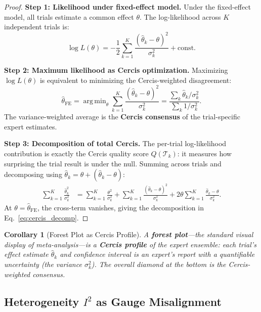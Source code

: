 \documentclass[12pt,a4paper]{article}
\newtheorem{corollary}[theorem]{Corollary}
\theoremstyle{remark}
\newcommand{\Cercis}{\textsf{Cercis}}
\DeclareMathOperator{\argmin}{arg\,min}
\begin{document}
\begin{proof}
\noindent\textbf{Step 1: Likelihood under fixed-effect model.}
Under the fixed-effect model, all trials estimate a common effect $\theta$.
The log-likelihood across $K$ independent trials is:
\begin{equation}
  \log L(\theta) = -\frac{1}{2} \sum_{k=1}^K \frac{(\hat{\theta}_k - \theta)^2}
  {\sigma_k^2} + \text{const}.
\end{equation}

\smallskip
\noindent\textbf{Step 2: Maximum likelihood as Cercis optimization.}
Maximizing $\log L(\theta)$ is equivalent to minimizing the
Cercis-weighted disagreement:
\begin{equation}
  \hat{\theta}_{\text{FE}} = \argmin_\theta \sum_{k=1}^K
  \frac{(\hat{\theta}_k - \theta)^2}{\sigma_k^2}
  = \frac{\sum_k \hat{\theta}_k / \sigma_k^2}{\sum_k 1/\sigma_k^2}.
\end{equation}
The variance-weighted average is the \textbf{Cercis consensus} of the
trial-specific expert estimates.

\smallskip
\noindent\textbf{Step 3: Decomposition of total Cercis.}
The per-trial log-likelihood contribution is exactly the \Cercis{} quality
score $Q(\mathcal{T}_k)$: it measures how surprising the trial result is
under the null. Summing across trials and decomposing using
$\hat{\theta}_k = \theta + (\hat{\theta}_k - \theta)$:
\begin{align}
  \sum_{k=1}^K \frac{\hat{\theta}_k^2}{\sigma_k^2}
  &= \sum_{k=1}^K \frac{\theta^2}{\sigma_k^2}
  + \sum_{k=1}^K \frac{(\hat{\theta}_k - \theta)^2}{\sigma_k^2}
  + 2\theta\sum_{k=1}^K \frac{\hat{\theta}_k - \theta}{\sigma_k^2}.
\end{align}
At $\theta = \hat{\theta}_{\text{FE}}$, the cross-term vanishes, giving
the decomposition in Eq.~\eqref{eq:cercis_decomp}.
\end{proof}

\begin{corollary}[Forest Plot as Cercis Profile]
\label{cor:forest_plot}
A \textbf{forest plot}---the standard visual display of meta-analysis---is
a \textbf{Cercis profile} of the expert ensemble: each trial's effect
estimate $\hat{\theta}_k$ and confidence interval is an expert's report
with a quantifiable uncertainty (the variance $\sigma_k^2$). The overall
diamond at the bottom is the Cercis-weighted consensus.
\end{corollary}

\subsection{Heterogeneity $I^2$ as Gauge Misalignment}
\end{document}
